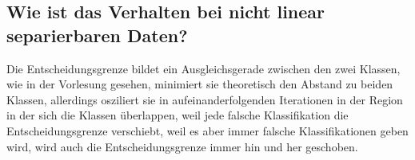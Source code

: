 \subsection{Wie ist das Verhalten bei nicht linear separierbaren Daten?}
Die Entscheidungsgrenze bildet ein Ausgleichsgerade zwischen den zwei Klassen, wie in der Vorlesung gesehen, minimiert sie theoretisch den Abstand zu beiden Klassen, allerdings osziliert sie in aufeinanderfolgenden Iterationen in der Region in der sich die Klassen überlappen, weil jede falsche Klassifikation die Entscheidungsgrenze verschiebt, weil es aber immer falsche Klassifikationen geben wird, wird auch die Entscheidungsgrenze immer hin und her geschoben.